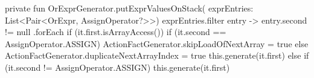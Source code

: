 \begin{KotlinCode}[float,numbers=none,caption=Implementation of the \texttt{putExprValuesOnStack} extension function in the \texttt{ExpressionGenerator}., label=lst:BtGenExprGenValStack]
    private fun OrExprGenerator.putExprValuesOnStack(
        exprEntries: List<Pair<OrExpr, AssignOperator?>>) {
        exprEntries.filter { entry ->
            entry.second != null
        }.forEach {
            if (it.first.isArrayAccess()) {
                if (it.second == AssignOperator.ASSIGN) {
                    ActionFactGenerator.skipLoadOfNextArray = true
                } else {
                    ActionFactGenerator.duplicateNextArrayIndex = true
                }
                this.generate(it.first)
            } else {
                if (it.second != AssignOperator.ASSIGN) {
                    this.generate(it.first)
                }
            }
        }
    }
    \end{KotlinCode}



